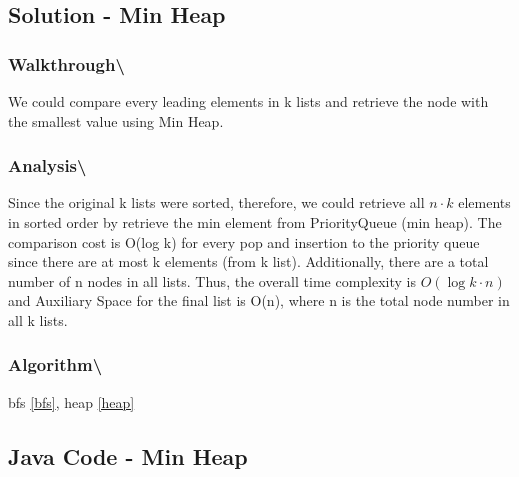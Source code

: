 \documentclass[]{book}
\begin{document}
\hypertarget{solution---min-heap}{%
\subsection{Solution - Min Heap}\label{solution---min-heap}}

\hypertarget{walkthrough-110}{%
\subsubsection{Walkthrough\textbackslash{}}\label{walkthrough-110}}

We could compare every leading elements in k lists and retrieve the node with the smallest value using Min Heap.

\hypertarget{analysis-117}{%
\subsubsection{Analysis\textbackslash{}}\label{analysis-117}}

Since the original k lists were sorted, therefore, we could retrieve all \(n \cdot k\) elements in
sorted order by retrieve the min element from PriorityQueue (min heap). The comparison cost is O(log k) for every pop
and insertion to the priority queue since there are at most k elements (from k list). Additionally, there are
a total number of n nodes in all lists. Thus, the overall time complexity is \(O(\log k \cdot n)\) and Auxiliary Space
for the ﬁnal list is O(n), where n is the total node number in all k lists.

\hypertarget{algorithm-123}{%
\subsubsection{Algorithm\textbackslash{}}\label{algorithm-123}}

bfs \ref{bfs}, heap \ref{heap}

\hypertarget{java-code---min-heap}{%
\subsection{Java Code - Min Heap}\label{java-code---min-heap}}
\end{document}
